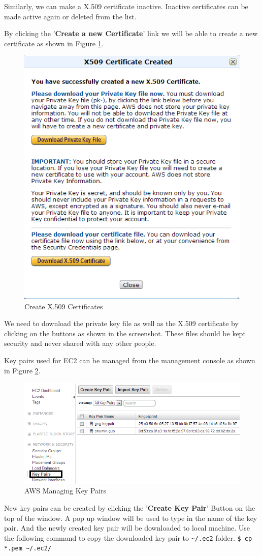 Similarly, we can make a X.509 certificate inactive. Inactive certificates can be made active again or deleted from the list.

By clicking the '\textbf{Create a new Certificate}' link we will be able to create a new certificate as shown in Figure \ref{fig:aws.create.x509}.
\begin{figure}[ht]
  \centering
  \includegraphics[width=.65\textwidth]{figs/5163os_08_10.png}
  \caption{Create X.509 Certificates}\label{fig:aws.create.x509}
\end{figure} 
We need to download the private key file as well as the X.509 certificate by clicking on the buttons as shown in the screenshot. These files should be kept security and never shared with any other people.

Key pairs used for EC2 can be managed from the management console as shown in Figure \ref{fig:aws.keypair.management}.
\begin{figure}[ht]
  \centering
  \includegraphics[width=.8\textwidth]{figs/5163os_08_14.png}
  \caption{AWS Managing Key Pairs}\label{fig:aws.keypair.management}
\end{figure} 
New key pairs can be created by clicking the '\textbf{Create Key Pair}' Button on the top of the window. A pop up window will be used to type in the name of the key pair. And the newly created key pair will be downloaded to local machine.
Use the following command to copy the downloaded key pair to \verb|~/.ec2| folder.
\verb|$ cp *.pem ~/.ec2/|

